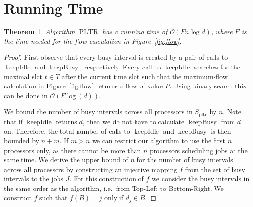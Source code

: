 \documentclass[a4paper]{article}
\DeclareMathOperator{\pltr}{pltr}
\DeclareMathOperator{\PLTR}{PLTR}
\DeclareMathOperator{\keepidle}{keepIdle}
\DeclareMathOperator{\keepbusy}{keepBusy}
\newtheorem{theorem}{Theorem}
\begin{document}
\section{Running Time}\label{section:running_time}
\begin{theorem}
  Algorithm $\PLTR$ has a running time of $\mathcal{O}(F n \log d)$, where $F$ is the time needed for the flow calculation in Figure~\ref{fig:flow}.
\end{theorem}
\begin{proof}
  First observe that every busy interval is created by a pair of calls to $\keepidle$ and $\keepbusy$, respectively.
  Every call to $\keepidle$ searches for the maximal slot $t \in T$ after the current time slot such that the maximum-flow calculation in Figure~\ref{fig:flow} returns a flow of value $P$.
  Using binary search this can be done in $\mathcal{O}(F \log(d))$.

  We bound the number of busy intervals across all processors in $S_{\pltr}$ by $n$.
  Note that if $\keepidle$ returns $d$, then we do not have to calculate $\keepbusy$ from $d$ on.
  Therefore, the total number of calls to $\keepidle$ and $\keepbusy$ is then bounded by $n + m$.
  If $m > n$ we can restrict our algorithm to use the first $n$ processors only, as there cannot be more than $n$ processors scheduling jobs at the same time.
  We derive the upper bound of $n$ for the number of busy intervals across all processors by constructing an injective mapping $f$ from the set of busy intervals to the jobs $J$.
  For this construction of $f$ we consider the busy intervals in the same order as the algorithm, i.e.\ from Top-Left to Bottom-Right.
  We construct $f$ such that $f(B) = j$ only if $d_j \in B$.


\end{proof}
\end{document}
